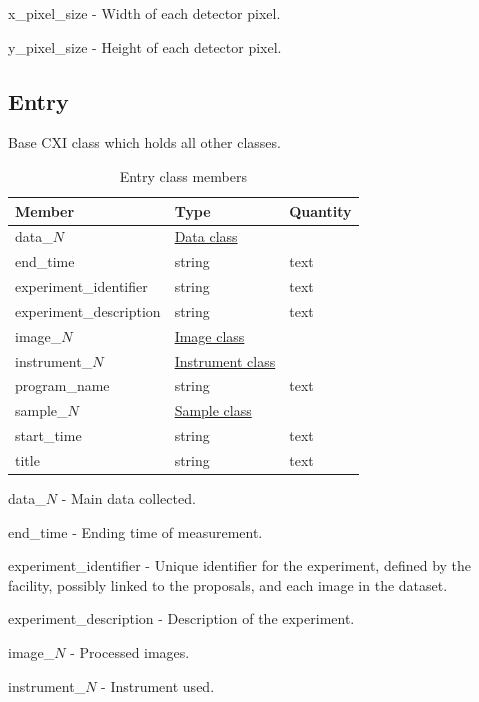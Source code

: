 \documentclass[usletter,11pt]{article}
\newcommand{\member}[2]
{ \noindent
{ \color{softBlue}  #1 - } #2
\vspace{0.2cm}
}
\begin{document}
   

\member{x\_pixel\_size}{Width of each detector pixel.}

\member{y\_pixel\_size}{Height of each detector pixel.}




\subsection{Entry}
\label{table:entry}

Base CXI class which holds all other classes.

\begin{table}[h!]\sffamily \footnotesize
\caption{Entry class members}

\begin{tabular}{p{4.5cm} p{4.5cm}  p{2.5cm} }
\toprule
\bfseries Member     & \bfseries Type & \bfseries Quantity \\
\midrule
data\_$N$ & \hyperref[table:data]{Data class} & \\
end\_time  & string & text \\  
experiment\_identifier & string  & text \\
experiment\_description & string & text \\
image\_$N$ & \hyperref[table:image]{Image class} & \\
instrument\_$N$ & \hyperref[table:instrument]{Instrument class} & \\ 
program\_name & string & text \\
sample\_$N$ & \hyperref[table:sample]{Sample class} &  \\
start\_time  & string & text  \\ 
title & string & text \\
\bottomrule
\end{tabular}
\end{table}


\member{data\_$N$}{Main data collected.}

\member{end\_time}{Ending time of measurement.}

\member{experiment\_identifier}{Unique identifier for the experiment,
defined by the facility, possibly linked to the proposals, and each image in the
dataset.}

\member{experiment\_description}{Description of the experiment.}

\member{image\_$N$}{Processed images.}

\member{instrument\_$N$}{Instrument used.}
\end{document}
